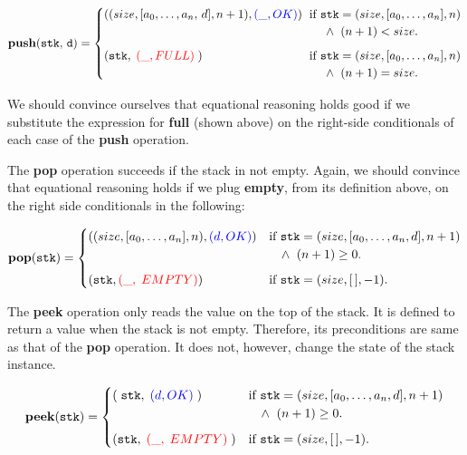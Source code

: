 \documentclass[10pt]{article}
\begin{document}
    \[
        \mathtt{\mathbf{push}(stk,\, d)} = \begin{cases} ((size, [a_0, \dots, a_n, \, d], n+1),  {\textcolor{blue}{(\_, OK)}}) & \hspace*{-4pt}\mbox{if } \mathtt{stk} = (size, [a_0,\dots,a_n], n)\\ & \hspace*{10pt}\wedge\; \; (n+1) < size. \vspace*{6pt}\\ 
        (\mathtt{stk},\;{\textcolor{red}{(\_, FULL)}} \; ) & \hspace*{-4pt}\mbox{if } \mathtt{stk} = (size, [a_0,\dots,a_n], n)\\ %
        & \hspace*{10pt}\wedge\; \; (n+1) = size. \end{cases} 
    \]

    We should convince ourselves that equational reasoning holds good if we substitute the expression for \textbf{full} (shown above) on the right-side conditionals of each case of the \textbf{push} operation. 
  
    The \textbf{pop} operation succeeds if the stack in not empty. Again, we should convince that equational reasoning holds if we plug \textbf{empty}, from its definition above, on the right side conditionals in the following: 

    \[
        \mathtt{\mathbf{pop}(stk)} = \begin{cases} ((size, [a_0, \dots, a_n], n), {\textcolor{blue}{(d, OK)}}) & \mbox{if } \mathtt{stk} = (size, [a_0,\dots,a_n, d], n+1)\\ & \hspace*{10pt}\wedge\; \; (n+1) \geq 0 . \vspace*{6pt}\\ 
        (\mathtt{stk},{\textcolor{red}{(\_,\; EMPTY)}})  & \mbox{if }\mathtt{stk} = (size, [\,], -1). \end{cases} 
    \]

    The \textbf{peek} operation only reads the value on the top of the stack. It is defined to return a value when the stack is not empty. Therefore, its preconditions are same as that of the \textbf{pop} operation. It does not, however, change the state of the stack instance.

    \[
        \mathtt{\mathbf{peek}(stk)} = \begin{cases} (\; \mathtt{stk}, \; {\textcolor{blue}{(d, OK)}}\;) & \mbox{if } \mathtt{stk} = (size, [a_0,\dots,a_n, d], n+1)\\ & \hspace*{10pt}\wedge\; \; (n+1) \geq 0 . \vspace*{6pt}\\ 
        (\mathtt{stk},\; {\textcolor{red}{(\_,\; EMPTY)}}\;)  & \mbox{if }\mathtt{stk} = (size, [\,], -1). \end{cases} 
    \]
\end{document}

